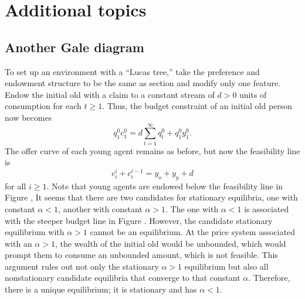 








\section{Additional topics}  %

%
\subsection{Another Gale diagram}\label{sec:olg_lucas_tree}%
To set up an environment with a ``Lucas tree,'' take the preference and endowment
structure to be the same as section  and modify only one feature.
Endow the initial old with a claim
to a constant stream of $d >0$ units of consumption for each
$t\geq 1$.
%
%
   Thus, the budget constraint of an initial old person now becomes
$$ q_1^0 c_1^0 = d \sum_{t=1}^\infty q_t^0 + q_1^0 y_1^0. $$
The offer curve of each young agent remains as before,
but now the feasibility line is
$$ c_i^i + c^{i-1}_i =  y_o + y_y + d $$
for all $i \geq 1$.  Note that young agents are  endowed
below the feasibility line in  Figure , %
It seems that there
are  two candidates for stationary equilibria, one
with constant  $\alpha < 1$, another with constant $\alpha >1$.
The one with $\alpha  <1$ is associated with the
steeper budget line in Figure . %
 However, the candidate stationary
equilibrium with $ \alpha >1 $ cannot be an equilibrium. %
 At the price
system associated with an $\alpha >1$, the wealth of the initial
old would be unbounded, which would prompt them to consume an
unbounded amount, which is not feasible.
This argument rules out not only the stationary $\alpha >1$ equilibrium
but also all nonstationary candidate equilibria that converge to
that constant $\alpha$.  Therefore, there is a unique equilibrium;
it is stationary and has $\alpha < 1$.

